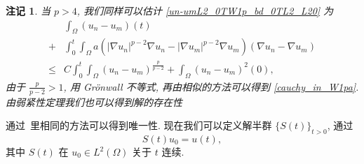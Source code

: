 \documentclass[twoside,longtitle]{LZUthesis}
\newtheorem{remark}[theorem]{注记}
\theoremstyle{definition}
\numberwithin{equation}{chapter}
\newcommand*\abs[1]{\lvert#1\rvert}
\newcommand*\Brace[1]{\lbrace#1\rbrace}
\begin{document}
\begin{remark}
	当 $p>4$, 我们同样可以估计 \cref{un-umL2_0TW1p_bd_0TL2_L20} 为
	\begin{equation}
		\begin{split}
			& \int_{\Omega}\left( u_n-u_m \right)(t)\\
			+{} & \int_{0}^{t}\int_{\Omega}a
			\left(\abs{\nabla u_n}^{p-2}\nabla u_n
			- \abs{\nabla u_m}^{p-2}\nabla u_m\right)
			\left(\nabla u_n - \nabla u_m\right)\\
			\leq{} & C\int_0^t\int_{\Omega}
			\left( u_n-u_m \right)^{\frac{p}{p-2}}
			+ \int_{\Omega}\left( u_n-u_m \right)^2(0),
		\end{split}
	\end{equation}
	由于 $\frac{p}{p-2}>1$, 用 Gr\"onwall 不等式,
	再由相似的方法可以得到 \cref{cauchy_in_W1pa}.
	由弱紧性定理我们也可以得到解的存在性
\end{remark}
通过~\cite{Zhan2019Uniquenessa}里相同的方法可以得到唯一性.
现在我们可以定义解半群 $\Brace{S(t)}_{t>0}$,
通过
\begin{equation}
	S(t)u_0 = u(t),
\end{equation}
其中 $S(t)$ 在 $u_{0} \in L^2(\Omega)$ 关于 $t$ 连续.
\end{document}
